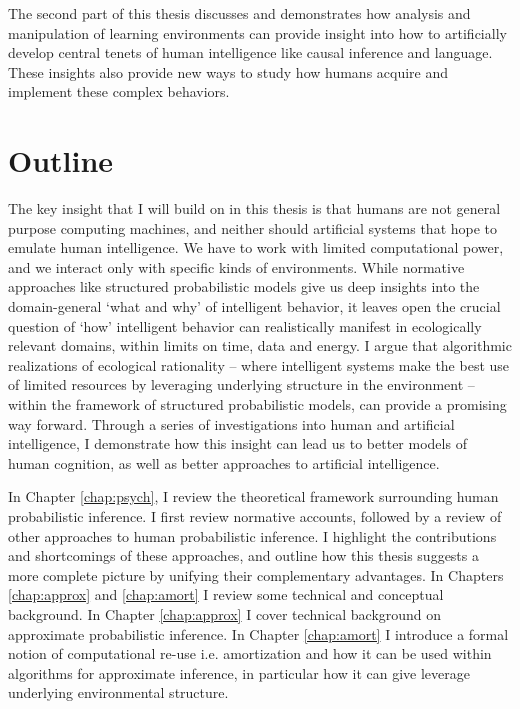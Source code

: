 The second part of this thesis discusses and demonstrates how analysis and manipulation of learning environments can provide insight into how to artificially develop central tenets of human intelligence like causal inference and language. These insights also provide new ways to study how humans acquire and implement these complex behaviors.


\section*{Outline}

The key insight that I will build on in this thesis is that humans are not general purpose computing machines, and neither should artificial systems that hope to emulate human intelligence. We have to work with limited computational power, and we interact only with specific kinds of environments. While normative approaches like structured probabilistic models give us deep insights into the domain-general `what and why' of intelligent behavior, it leaves open the crucial question of `how' intelligent behavior can realistically manifest in ecologically relevant domains, within limits on time, data and energy. I argue that algorithmic realizations of ecological rationality -- where intelligent systems make the best use of limited resources by leveraging underlying structure in the environment -- within the framework of structured probabilistic models, can provide a promising way forward. Through a series of investigations into human and artificial intelligence, I demonstrate how this insight can lead us to better models of human cognition, as well as better approaches to artificial intelligence.

In Chapter \ref{chap:psych}, I review the theoretical framework surrounding human probabilistic inference. I first review normative accounts, followed by a review of other approaches to human probabilistic inference. I highlight the contributions and shortcomings of these approaches, and outline how this thesis suggests a more complete picture by unifying their complementary advantages. In Chapters \ref{chap:approx} and \ref{chap:amort} I review some technical and conceptual background. In Chapter \ref{chap:approx} I cover technical background on approximate probabilistic inference. In Chapter \ref{chap:amort} I introduce a formal notion of computational re-use i.e. amortization and how it can be used within algorithms for approximate inference, in particular how it can give leverage underlying environmental structure.

